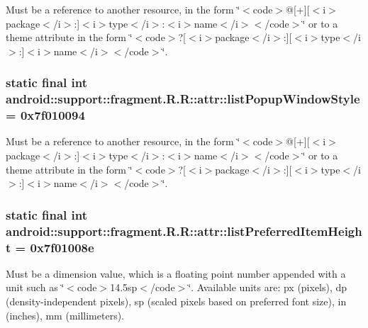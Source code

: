 Must be a reference to another resource, in the form \char`\"{}$<$code$>$@\mbox{[}+\mbox{]}\mbox{[}$<$i$>$package$<$/i$>$:\mbox{]}$<$i$>$type$<$/i$>$:$<$i$>$name$<$/i$>$$<$/code$>$\char`\"{} or to a theme attribute in the form \char`\"{}$<$code$>$?\mbox{[}$<$i$>$package$<$/i$>$:\mbox{]}\mbox{[}$<$i$>$type$<$/i$>$:\mbox{]}$<$i$>$name$<$/i$>$$<$/code$>$\char`\"{}. \hypertarget{classandroid_1_1support_1_1fragment_1_1_r_1_1attr_fa8976a287617655150650a6f7423ef4}{
\subsubsection[{listPopupWindowStyle}]{\setlength{\rightskip}{0pt plus 5cm}static final int android::support::fragment.R.R::attr::listPopupWindowStyle = 0x7f010094}}
\label{classandroid_1_1support_1_1fragment_1_1_r_1_1attr_fa8976a287617655150650a6f7423ef4}


Must be a reference to another resource, in the form \char`\"{}$<$code$>$@\mbox{[}+\mbox{]}\mbox{[}$<$i$>$package$<$/i$>$:\mbox{]}$<$i$>$type$<$/i$>$:$<$i$>$name$<$/i$>$$<$/code$>$\char`\"{} or to a theme attribute in the form \char`\"{}$<$code$>$?\mbox{[}$<$i$>$package$<$/i$>$:\mbox{]}\mbox{[}$<$i$>$type$<$/i$>$:\mbox{]}$<$i$>$name$<$/i$>$$<$/code$>$\char`\"{}. \hypertarget{classandroid_1_1support_1_1fragment_1_1_r_1_1attr_785a5c74ab9f3431ffcc65c5138f065f}{
\subsubsection[{listPreferredItemHeight}]{\setlength{\rightskip}{0pt plus 5cm}static final int android::support::fragment.R.R::attr::listPreferredItemHeight = 0x7f01008e}}
\label{classandroid_1_1support_1_1fragment_1_1_r_1_1attr_785a5c74ab9f3431ffcc65c5138f065f}


Must be a dimension value, which is a floating point number appended with a unit such as \char`\"{}$<$code$>$14.5sp$<$/code$>$\char`\"{}. Available units are: px (pixels), dp (density-independent pixels), sp (scaled pixels based on preferred font size), in (inches), mm (millimeters). 

